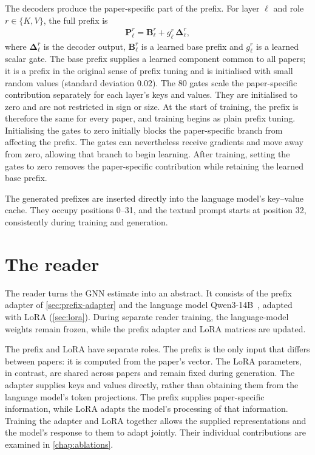 The decoders produce the paper-specific part of the prefix. For layer $\ell$ and role $r \in \{K, V\}$, the full prefix is
\begin{align}
  \mathbf{P}^r_\ell = \mathbf{B}^r_\ell + g^r_\ell \, \boldsymbol{\Delta}^r_\ell,
  \label{eq:prefix-gate}
\end{align}
where $\boldsymbol{\Delta}^r_\ell$ is the decoder output, $\mathbf{B}^r_\ell$ is a learned base prefix and $g^r_\ell$ is a learned scalar gate. The base prefix supplies a learned component common to all papers; it is a prefix in the original sense of prefix tuning and is initialised with small random values (standard deviation 0.02). The 80 gates scale the paper-specific contribution separately for each layer's keys and values. They are initialised to zero and are not restricted in sign or size. At the start of training, the prefix is therefore the same for every paper, and training begins as plain prefix tuning. Initialising the gates to zero initially blocks the paper-specific branch from affecting the prefix. The gates can nevertheless receive gradients and move away from zero, allowing that branch to begin learning. After training, setting the gates to zero removes the paper-specific contribution while retaining the learned base prefix.

The generated prefixes are inserted directly into the language model's key--value cache. They occupy positions 0--31, and the textual prompt starts at position 32, consistently during training and generation.

\section{The reader}
\label{sec:reader}

The reader turns the GNN estimate into an abstract. It consists of the prefix adapter of \autoref{sec:prefix-adapter} and the language model Qwen3-14B~\cite{yang2025qwen3}, adapted with LoRA (\autoref{sec:lora}). During separate reader training, the language-model weights remain frozen, while the prefix adapter and LoRA matrices are updated.

The prefix and LoRA have separate roles. The prefix is the only input that differs between papers: it is computed from the paper's vector. The LoRA parameters, in contrast, are shared across papers and remain fixed during generation. The adapter supplies keys and values directly, rather than obtaining them from the language model's token projections. The prefix supplies paper-specific information, while LoRA adapts the model's processing of that information. Training the adapter and LoRA together allows the supplied representations and the model's response to them to adapt jointly. Their individual contributions are examined in \autoref{chap:ablations}.

